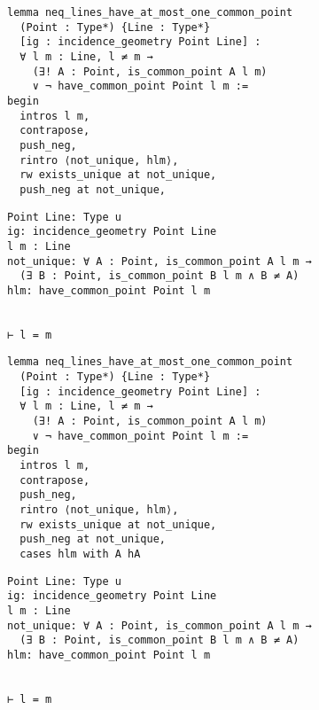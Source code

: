 \begin{frame}[fragile]
	\begin{multicols}{2}
		\begin{lstlisting}
lemma neq_lines_have_at_most_one_common_point 
  (Point : Type*) {Line : Type*} 
  [ig : incidence_geometry Point Line] :
  ∀ l m : Line, l ≠ m → 
    (∃! A : Point, is_common_point A l m) 
    ∨ ¬ have_common_point Point l m := 
begin
  intros l m,
  contrapose,
  push_neg,
  rintro ⟨not_unique, hlm⟩,
  rw exists_unique at not_unique,
  push_neg at not_unique,
\end{lstlisting}
		\columnbreak
		\begin{lstlisting}
Point Line: Type u
ig: incidence_geometry Point Line
l m : Line
not_unique: ∀ A : Point, is_common_point A l m → 
  (∃ B : Point, is_common_point B l m ∧ B ≠ A)
hlm: have_common_point Point l m


⊢ l = m
		\end{lstlisting}
	\end{multicols}
\end{frame}










\begin{frame}[fragile]
	\begin{multicols}{2}
		\begin{lstlisting}
lemma neq_lines_have_at_most_one_common_point 
  (Point : Type*) {Line : Type*} 
  [ig : incidence_geometry Point Line] :
  ∀ l m : Line, l ≠ m → 
    (∃! A : Point, is_common_point A l m) 
    ∨ ¬ have_common_point Point l m := 
begin
  intros l m,
  contrapose,
  push_neg,
  rintro ⟨not_unique, hlm⟩,
  rw exists_unique at not_unique,
  push_neg at not_unique,
  cases hlm with A hA
\end{lstlisting}
		\columnbreak
		\begin{lstlisting}
Point Line: Type u
ig: incidence_geometry Point Line
l m : Line
not_unique: ∀ A : Point, is_common_point A l m → 
  (∃ B : Point, is_common_point B l m ∧ B ≠ A)
hlm: have_common_point Point l m


⊢ l = m
		\end{lstlisting}
	\end{multicols}
\end{frame}










